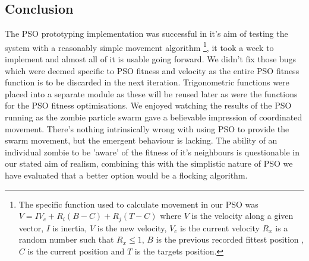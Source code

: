\subsection{Conclusion}
The PSO prototyping implementation was successful in it's aim of testing the system with a reasonably simple movement algorithm \footnote{The specific function used to calculate  movement in our PSO was \(V = IV_{c} + R_{i}(B-C) + R_{j}(T-C)\) where \(V\) is the velocity along a given vector, \(I\) is inertia, \(V\) is the new velocity, \(V_{c}\) is the current velocity \(R_{x}\) is a random number such that \(R_{x} \leq 1\), \(B\) is the previous recorded fittest position ,\(C\) is the current position and \(T\) is the targets position.}, it took a week to implement and almost all of it is usable going forward. We didn't fix those bugs which were deemed specific to PSO fitness and velocity as the entire PSO fitness function is to be discarded in the next iteration. Trigonometric functions were placed into a separate module as these will be reused later as were the functions for the PSO fitness optimisations. We enjoyed watching the results of the PSO running as the zombie particle swarm gave a believable impression of coordinated movement. There's nothing intrinsically wrong with using PSO to provide the swarm movement, but the emergent behaviour is lacking. The ability of an individual zombie to be 'aware' of the fitness of it's neighbours is questionable in our stated aim of realism, combining this with the simplistic nature of PSO we have evaluated that a better option would be a flocking algorithm.

\clearpage
\endinput
